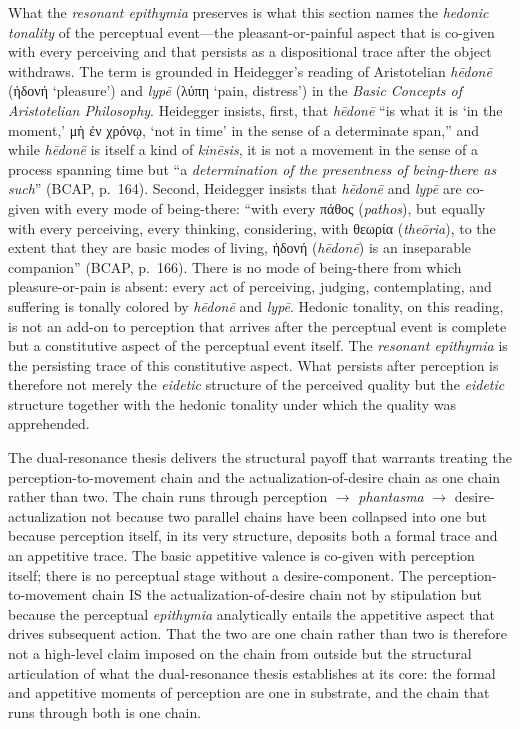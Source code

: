 \documentclass{article}
\newcommand{\gk}[1]{{\greekfont #1}}
\begin{document}
What the \textit{resonant epithymia} preserves is what this section names the \textit{hedonic tonality} of the perceptual event---the pleasant-or-painful aspect that is co-given with every perceiving and that persists as a dispositional trace after the object withdraws. The term is grounded in Heidegger's reading of Aristotelian \textit{hēdonē} (\gk{ἡδονή} `pleasure') and \textit{lypē} (\gk{λύπη} `pain, distress') in the \textit{Basic Concepts of Aristotelian Philosophy}. Heidegger insists, first, that \textit{hēdonē} ``is what it is `in the moment,' \gk{μὴ ἐν χρόνῳ}, `not in time' in the sense of a determinate span,'' and while \textit{hēdonē} is itself a kind of \textit{kinēsis}, it is not a movement in the sense of a process spanning time but ``a \textit{determination of the presentness of being-there as such}'' (BCAP, p.~164). Second, Heidegger insists that \textit{hēdonē} and \textit{lypē} are co-given with every mode of being-there: ``with every \gk{πάθος} (\textit{pathos}), but equally with every perceiving, every thinking, considering, with \gk{θεωρία} (\textit{theōria}), to the extent that they are basic modes of living, \gk{ἡδονή} (\textit{hēdonē}) is an inseparable companion'' (BCAP, p.~166). There is no mode of being-there from which pleasure-or-pain is absent: every act of perceiving, judging, contemplating, and suffering is tonally colored by \textit{hēdonē} and \textit{lypē}. Hedonic tonality, on this reading, is not an add-on to perception that arrives after the perceptual event is complete but a constitutive aspect of the perceptual event itself. The \textit{resonant epithymia} is the persisting trace of this constitutive aspect. What persists after perception is therefore not merely the \textit{eidetic} structure of the perceived quality but the \textit{eidetic} structure together with the hedonic tonality under which the quality was apprehended.

The dual-resonance thesis delivers the structural payoff that warrants treating the perception-to-movement chain and the actualization-of-desire chain as one chain rather than two. The chain runs through perception $\rightarrow$ \textit{phantasma} $\rightarrow$ desire-actualization not because two parallel chains have been collapsed into one but because perception itself, in its very structure, deposits both a formal trace and an appetitive trace. The basic appetitive valence is co-given with perception itself; there is no perceptual stage without a desire-component. The perception-to-movement chain IS the actualization-of-desire chain not by stipulation but because the perceptual \textit{epithymia} analytically entails the appetitive aspect that drives subsequent action. That the two are one chain rather than two is therefore not a high-level claim imposed on the chain from outside but the structural articulation of what the dual-resonance thesis establishes at its core: the formal and appetitive moments of perception are one in substrate, and the chain that runs through both is one chain.
\end{document}
